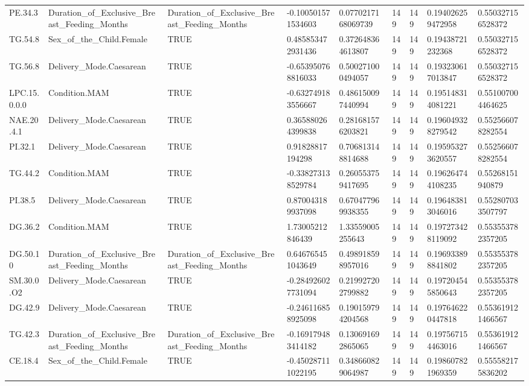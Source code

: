 \begin{longtable}{lllllllll}
PE.34.3 & Duration\_of\_Exclusive\_Breast\_Feeding\_Months & Duration\_of\_Exclusive\_Breast\_Feeding\_Months & -0.100501571534603 & 0.0770217168069739 & 149 & 149 & 0.194026259472958 & 0.550327156528372 \\
TG.54.8 & Sex\_of\_the\_Child.Female & TRUE & 0.485853472931436 & 0.372648364613807 & 149 & 149 & 0.19438721232368 & 0.550327156528372 \\
TG.56.8 & Delivery\_Mode.Caesarean & TRUE & -0.653950768816033 & 0.500271000494057 & 149 & 149 & 0.193230617013847 & 0.550327156528372 \\
LPC.15.0.0.0 & Condition.MAM & TRUE & -0.632749183556667 & 0.486150097440994 & 149 & 149 & 0.195148314081221 & 0.551007004464625 \\
NAE.20.4.1 & Delivery\_Mode.Caesarean & TRUE & 0.365880264399838 & 0.281681576203821 & 149 & 149 & 0.196049328279542 & 0.552566078282554 \\
PI.32.1 & Delivery\_Mode.Caesarean & TRUE & 0.91828817194298 & 0.706813148814688 & 149 & 149 & 0.195953273620557 & 0.552566078282554 \\
TG.44.2 & Condition.MAM & TRUE & -0.338273138529784 & 0.260553759417695 & 149 & 149 & 0.196264744108235 & 0.55268151940879 \\
PI.38.5 & Delivery\_Mode.Caesarean & TRUE & 0.870043189937098 & 0.670477969938355 & 149 & 149 & 0.196483813046016 & 0.552807033507797 \\
DG.36.2 & Condition.MAM & TRUE & 1.73005212846439 & 1.33559005255643 & 149 & 149 & 0.197273428119092 & 0.553553782357205 \\
DG.50.10 & Duration\_of\_Exclusive\_Breast\_Feeding\_Months & Duration\_of\_Exclusive\_Breast\_Feeding\_Months & 0.646765451043649 & 0.498918598957016 & 149 & 149 & 0.196933898841802 & 0.553553782357205 \\
SM.30.0.O2 & Delivery\_Mode.Caesarean & TRUE & -0.284926027731094 & 0.219927202799882 & 149 & 149 & 0.197204545850643 & 0.553553782357205 \\
DG.42.9 & Delivery\_Mode.Caesarean & TRUE & -0.246116858925098 & 0.190159794204568 & 149 & 149 & 0.197646220447818 & 0.553619121466567 \\
TG.42.3 & Duration\_of\_Exclusive\_Breast\_Feeding\_Months & Duration\_of\_Exclusive\_Breast\_Feeding\_Months & -0.169179483414182 & 0.130691692865065 & 149 & 149 & 0.197567154463016 & 0.553619121466567 \\
CE.18.4 & Sex\_of\_the\_Child.Female & TRUE & -0.450287111022195 & 0.348660829064987 & 149 & 149 & 0.198607821969359 & 0.555582175836202 \\

\end{longtable}
